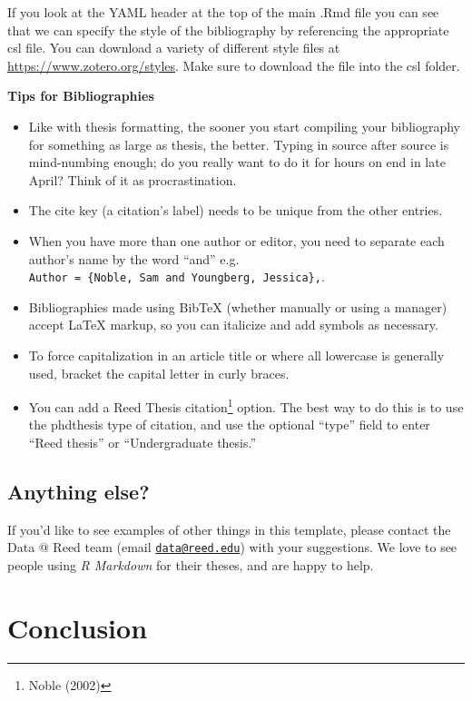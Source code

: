 \documentclass[12pt,twoside]{reedthesis}
\providecommand{\tightlist}{%
  \setlength{\itemsep}{0pt}\setlength{\parskip}{0pt}}
\begin{document}
If you look at the YAML header at the top of the main .Rmd file you can see that we can specify the style of the bibliography by referencing the appropriate csl file. You can download a variety of different style files at \url{https://www.zotero.org/styles}. Make sure to download the file into the csl folder.

\vfill

\textbf{Tips for Bibliographies}
\begin{itemize}
\tightlist
\item
  Like with thesis formatting, the sooner you start compiling your bibliography for something as large as thesis, the better. Typing in source after source is mind-numbing enough; do you really want to do it for hours on end in late April? Think of it as procrastination.
\item
  The cite key (a citation's label) needs to be unique from the other entries.
\item
  When you have more than one author or editor, you need to separate each author's name by the word ``and'' e.g. \texttt{Author\ =\ \{Noble,\ Sam\ and\ Youngberg,\ Jessica\},}.
\item
  Bibliographies made using BibTeX (whether manually or using a manager) accept LaTeX markup, so you can italicize and add symbols as necessary.
\item
  To force capitalization in an article title or where all lowercase is generally used, bracket the capital letter in curly braces.
\item
  You can add a Reed Thesis citation\footnote{Noble (2002)} option. The best way to do this is to use the phdthesis type of citation, and use the optional ``type'' field to enter ``Reed thesis'' or ``Undergraduate thesis.''
\end{itemize}
\hypertarget{anything-else}{%
\section{Anything else?}\label{anything-else}}

If you'd like to see examples of other things in this template, please contact the Data @ Reed team (email \href{mailto:data@reed.edu}{\nolinkurl{data@reed.edu}}) with your suggestions. We love to see people using \emph{R Markdown} for their theses, and are happy to help.

\hypertarget{conclusion}{%
\chapter*{Conclusion}\label{conclusion}}
\end{document}
